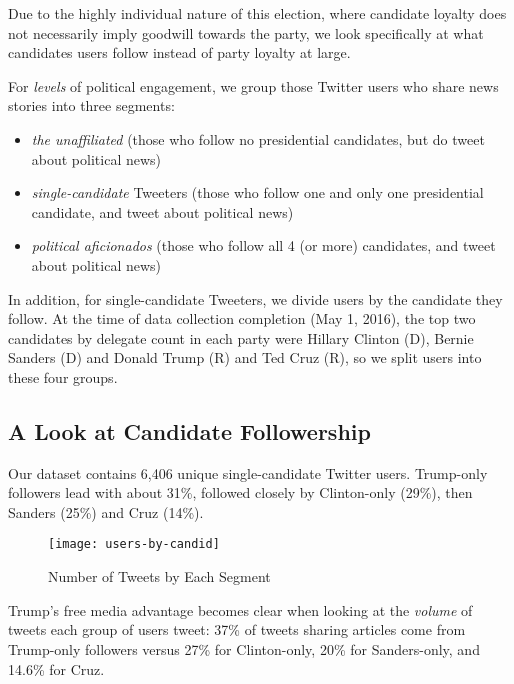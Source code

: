 Due to the highly individual nature of this election, where candidate loyalty does not necessarily imply goodwill towards the party, we look specifically at what candidates users follow instead of party loyalty at large. 

For \emph{levels} of political engagement, we group those Twitter users who share news stories into three segments: 

\begin{itemize}
  \item \emph{the unaffiliated} (those who follow no presidential candidates, but do tweet about political news)
  \item \emph{single-candidate} Tweeters (those who follow one and only one presidential candidate, and tweet about political news)
  \item \emph{political aficionados} (those who follow all 4 (or more) candidates, and tweet about political news)
\end{itemize}

In addition, for single-candidate Tweeters, we divide users by the candidate they follow. At the time of data collection completion (May 1, 2016), the top two candidates by delegate count in each party were Hillary Clinton (D), Bernie Sanders (D) and Donald Trump (R) and Ted Cruz (R), so we split users into these four groups. 


\subsection{A Look at Candidate Followership}

Our dataset contains 6,406 unique single-candidate Twitter users. Trump-only followers lead with about 31\%, followed closely by Clinton-only (29\%), then Sanders (25\%) and Cruz (14\%).


\begin{figure}[H]  
\centering 
  \texttt{[image: users-by-candid]}  
  \caption{Number of Tweets by Each Segment
    \label{fig:users-by-candid}}
\end{figure} 

 

Trump's free media advantage becomes clear when looking at the \emph{volume} of tweets each group of users tweet: 37\% of tweets sharing articles come from Trump-only followers versus 27\% for Clinton-only, 20\% for Sanders-only, and 14.6\% for Cruz.

